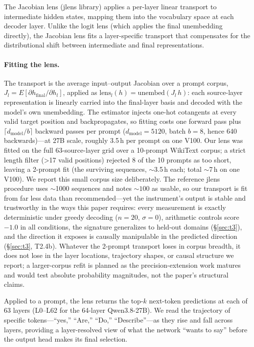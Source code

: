 \documentclass[11pt,a4paper]{article}
\begin{document}
The Jacobian lens (jlens library) applies a per-layer linear transport to intermediate hidden states, mapping them into the vocabulary space at each decoder layer. Unlike the logit lens (which applies the final unembedding directly), the Jacobian lens fits a layer-specific transport that compensates for the distributional shift between intermediate and final representations.

\paragraph{Fitting the lens.} The transport is the average input--output Jacobian over a prompt corpus, $J_l = E[\partial h_{\mathrm{final}} / \partial h_l]$, applied as $\mathrm{lens}_l(h) = \mathrm{unembed}(J_l\, h)$: each source-layer representation is linearly carried into the final-layer basis and decoded with the model's own unembedding. The estimator injects one-hot cotangents at every valid target position and backpropagates, so fitting costs one forward pass plus $\lceil d_{\mathrm{model}} / b \rceil$ backward passes per prompt ($d_{\mathrm{model}}{=}5120$, batch $b{=}8$, hence 640 backwards)---at 27B scale, roughly 3.5\,h per prompt on one V100. Our lens was fitted on the full 63-source-layer grid over a 10-prompt WikiText corpus; a strict length filter (>17 valid positions) rejected 8 of the 10 prompts as too short, leaving a 2-prompt fit (the surviving sequences, ${\sim}$3.5\,h each; total ${\sim}$7\,h on one V100). We report this small corpus size deliberately. The reference jlens procedure uses ${\sim}$1000 sequences and notes ${\sim}100$ as usable, so our transport is fit from far less data than recommended---yet the instrument's output is stable and trustworthy in the ways this paper requires: every measurement is exactly deterministic under greedy decoding ($n{=}20$, $\sigma{=}0$), arithmetic controls score $-1.0$ in all conditions, the signature generalizes to held-out domains (\S\ref{sec:t3}), and the direction it exposes is causally manipulable in the predicted direction (\S\ref{sec:t3}, T2.4b). Whatever the 2-prompt transport loses in corpus breadth, it does not lose in the layer locations, trajectory shapes, or causal structure we report; a larger-corpus refit is planned as the precision-extension work matures and would test absolute probability magnitudes, not the paper's structural claims.

Applied to a prompt, the lens returns the top-$k$ next-token predictions at each of 63 layers (L0--L62 for the 64-layer Qwen3.8-27B). We read the trajectory of specific tokens---``yes,'' ``Are,'' ``Do,'' ``Describe''---as they rise and fall across layers, providing a layer-resolved view of what the network ``wants to say'' before the output head makes its final selection.
\end{document}
